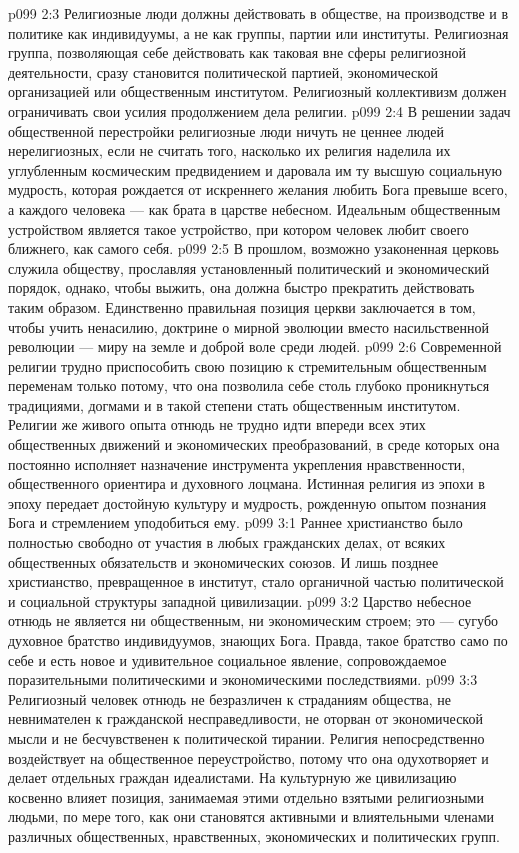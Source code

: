 \vs p099 2:3 \pc Религиозные люди должны действовать в обществе, на производстве и в политике как индивидуумы, а не как группы, партии или институты. Религиозная группа, позволяющая себе действовать как таковая вне сферы религиозной деятельности, сразу становится политической партией, экономической организацией или общественным институтом. Религиозный коллективизм должен ограничивать свои усилия продолжением дела религии.
\vs p099 2:4 В решении задач общественной перестройки религиозные люди ничуть не ценнее людей нерелигиозных, если не считать того, насколько их религия наделила их углубленным космическим предвидением и даровала им ту высшую социальную мудрость, которая рождается от искреннего желания любить Бога превыше всего, а каждого человека --- как брата в царстве небесном. Идеальным общественным устройством является такое устройство, при котором человек любит своего ближнего, как самого себя.
\vs p099 2:5 \pc В прошлом, возможно узаконенная церковь служила обществу, прославляя установленный политический и экономический порядок, однако, чтобы выжить, она должна быстро прекратить действовать таким образом. Единственно правильная позиция церкви заключается в том, чтобы учить ненасилию, доктрине о мирной эволюции вместо насильственной революции --- миру на земле и доброй воле среди людей.
\vs p099 2:6 Современной религии трудно приспособить свою позицию к стремительным общественным переменам только потому, что она позволила себе столь глубоко проникнуться традициями, догмами и в такой степени стать общественным институтом. Религии же живого опыта отнюдь не трудно идти впереди всех этих общественных движений и экономических преобразований, в среде которых она постоянно исполняет назначение инструмента укрепления нравственности, общественного ориентира и духовного лоцмана. Истинная религия из эпохи в эпоху передает достойную культуру и мудрость, рожденную опытом познания Бога и стремлением уподобиться ему.
\vs p099 3:1 Раннее христианство было полностью свободно от участия в любых гражданских делах, от всяких общественных обязательств и экономических союзов. И лишь позднее христианство, превращенное в институт, стало органичной частью политической и социальной структуры западной цивилизации.
\vs p099 3:2 \pc Царство небесное отнюдь не является ни общественным, ни экономическим строем; это --- сугубо духовное братство индивидуумов, знающих Бога. Правда, такое братство само по себе и есть новое и удивительное социальное явление, сопровождаемое поразительными политическими и экономическими последствиями.
\vs p099 3:3 Религиозный человек отнюдь не безразличен к страданиям общества, не невнимателен к гражданской несправедливости, не оторван от экономической мысли и не бесчувственен к политической тирании. Религия непосредственно воздействует на общественное переустройство, потому что она одухотворяет и делает отдельных граждан идеалистами. На культурную же цивилизацию косвенно влияет позиция, занимаемая этими отдельно взятыми религиозными людьми, по мере того, как они становятся активными и влиятельными членами различных общественных, нравственных, экономических и политических групп.
